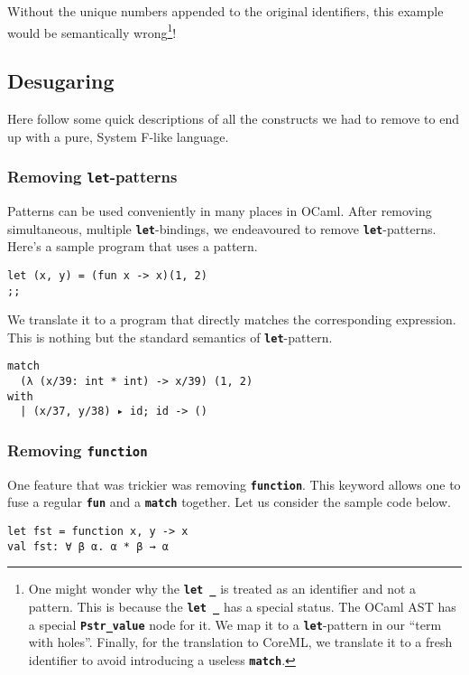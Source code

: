 \documentclass[10pt,a4paper,twoside,titlepage,twocolumn]{article}
\newcommand{\code}[1]{\textbf{\texttt{#1}}}
\begin{document}
Without the unique numbers appended to the original identifiers, this example
would be semantically wrong\footnote{One might wonder why the \code{let \_} is
treated as an identifier and not a pattern. This is because the \code{let \_}
has a special status. The OCaml AST has a special \code{Pstr\_value} node for
it. We map it to a \code{let}-pattern in our ``term with holes''. Finally, for
the translation to CoreML, we translate it to a fresh identifier to avoid
introducing a useless \code{match}.}!

\subsection{Desugaring}

Here follow some quick descriptions of all the constructs we had to remove to
end up with a pure, System F-like language.

\subsubsection{Removing \code{let}-patterns}

Patterns can be used conveniently in many places in OCaml. After removing
simultaneous, multiple \code{let}-bindings, we endeavoured to remove
\code{let}-patterns. Here's a sample program that uses a pattern.

\begin{verbatim}
let (x, y) = (fun x -> x)(1, 2)
;;
\end{verbatim}
We translate it to a program that directly matches the corresponding expression.
This is nothing but the standard semantics of \code{let}-pattern.
\begin{verbatim}
match
  (λ (x/39: int * int) -> x/39) (1, 2)
with
  | (x/37, y/38) ▸ id; id -> ()
\end{verbatim}

\subsubsection{Removing \code{function}}

One feature that was trickier was removing \code{function}. This keyword allows
one to fuse a regular \code{fun} and a \code{match} together. Let us consider
the sample code below.

\begin{verbatim}
let fst = function x, y -> x
val fst: ∀ β α. α * β → α
\end{verbatim}
\end{document}
